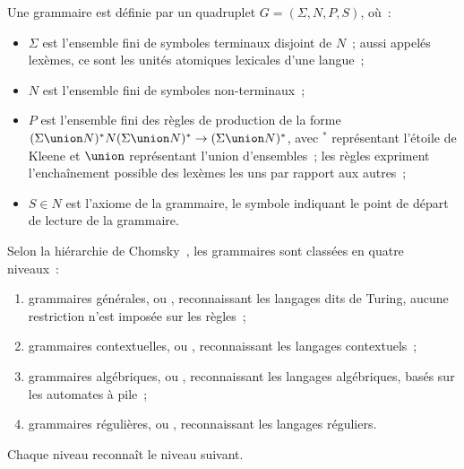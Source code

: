 \begin{definition}[Grammaire]

Une grammaire est définie par un quadruplet $G = (\Sigma, N, P, S)$, où~:
%
\begin{itemize}

\item $\Sigma$ est l'ensemble fini de {\strong symboles terminaux} disjoint de
$N$~; aussi appelés {\strong lexèmes}, ce sont les unités atomiques lexicales
d'une langue~;

\item $N$ est l'ensemble fini de {\strong symboles non-terminaux}~;

\item $P$ est l'ensemble fini des {\strong règles de production} de la forme
$(\Sigma \union N)^* N (\Sigma \union N)^* \rightarrow (\Sigma \union N)^*$,
avec $^*$ représentant l'étoile de Kleene et $\union$ représentant l'union
d'ensembles~; les règles expriment l'enchaînement possible des lexèmes les uns
par rapport aux autres~;

\item $S \in N$ est l'axiome de la grammaire, le symbole indiquant le point de
départ de lecture de la grammaire.

\end{itemize}

\end{definition}

Selon la hiérarchie de Chomsky~, les grammaires sont classées
en quatre niveaux~:
%
\begin{enumerate}

\item grammaires {\strong générales}, ou ,
reconnaissant les langages dits de Turing, aucune restriction n'est imposée sur
les règles~;

\item grammaires {\strong contextuelles}, ou , reconnaissant les langages contextuels~;

\item grammaires {\strong algébriques}, ou ,
reconnaissant les langages algébriques, basés sur les automates à pile~;

\item grammaires {\strong régulières}, ou ,
reconnaissant les langages réguliers.

\end{enumerate}
%
Chaque niveau reconnaît le niveau suivant.

